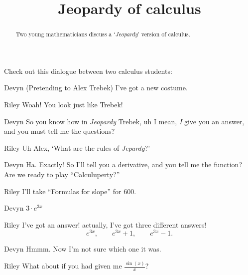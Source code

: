\documentclass{ximera}
\title[Break-Ground:]{Jeopardy of calculus}
\begin{document}
\begin{abstract}
  Two young mathematicians discuss a `\textit{Jeopardy}' version of calculus.
\end{abstract}
\maketitle

Check out this dialogue between two calculus students:


\begin{dialogue}
\item[Devyn] (Pretending to Alex Trebek) I've got a new costume.
\item[Riley] Woah! You look just like Trebek!
\item[Devyn] So you know how in \textit{Jeopardy} Trebek, uh I mean, \textit{I} give you an answer, and you must tell me the questions?
\item[Riley] Uh Alex, `What are the rules of \textit{Jepardy}?'
\item[Devyn] Ha. Exactly! So I'll tell you a derivative, and you tell
  me the function? Are we ready to play ``Calculuperty?''
\item[Riley] I'll take ``Formulas for slope'' for $600$.
\item[Devyn] $3\cdot e^{3x}$  
\item[Riley] I've got an answer!  actually, I've got three different answers!
  \[
  e^{3x},\qquad e^{3x}+1,\qquad e^{3x}-1.
  \]
\item[Devyn] Hmmm. Now I'm not sure which one it was.
\item[Riley] What about if you had given me $\frac{\sin(x)}{x}$?
\end{dialogue}


\end{document}
